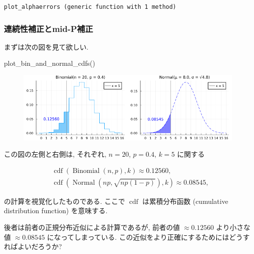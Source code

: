 \documentclass[
  letterpaper,
  DIV=11,
  numbers=noendperiod]{scrartcl}
\newenvironment{Shaded}{\begin{snugshade}}{\end{snugshade}}
\newcommand{\FunctionTok}[1]{\textcolor[rgb]{0.28,0.35,0.67}{#1}}
\newcommand{\NormalTok}[1]{\textcolor[rgb]{0.00,0.23,0.31}{#1}}
\begin{document}
\begin{verbatim}
plot_alphaerrors (generic function with 1 method)
\end{verbatim}

\hypertarget{ux9023ux7d9aux6027ux88dcux6b63ux3068mid-pux88dcux6b63}{%
\subsubsection{連続性補正とmid-P補正}\label{ux9023ux7d9aux6027ux88dcux6b63ux3068mid-pux88dcux6b63}}

まずは次の図を見て欲しい.

\begin{Shaded}
\begin{Highlighting}[]
\FunctionTok{plot\_bin\_and\_normal\_cdfs}\NormalTok{()}
\end{Highlighting}
\end{Shaded}

\begin{figure}[H]

{\centering \includegraphics{05 Central limit theorem_files/figure-pdf/cell-60-output-1.png}

}

\end{figure}

この図の左側と右側は, それぞれ, \(n=20\), \(p=0.4\), \(k=5\) に関する

\[
\begin{aligned}
&
\operatorname{cdf}(\operatorname{Binomial}(n, p), k) \approx 0.12560,
\\ &
\operatorname{cdf}(\operatorname{Normal}(np, \sqrt{np(1-p)}), k) \approx 0.08545,
\end{aligned}
\]

の計算を視覚化したものである. ここで \(\operatorname{cdf}\)
は累積分布函数 (cumulative distribution function) を意味する.

後者は前者の正規分布近似による計算であるが, 前者の値 \(\approx 0.12560\)
より小さな値 \(\approx 0.08545\) になってしまっている.
この近似をより正確にするためにはどうすればよいだろうか?
\end{document}
